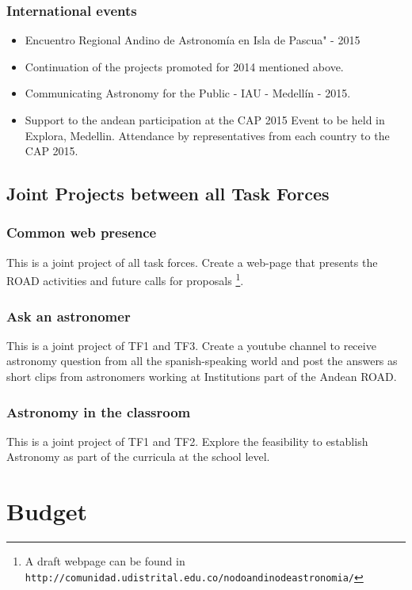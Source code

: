 \documentclass[12pt]{article}
\begin{document}
\subsubsection*{International events}


\begin{itemize}
\item Encuentro Regional Andino de Astronomía en Isla de Pascua" - 2015
\item Continuation of the projects promoted for 2014 mentioned above.
\item Communicating Astronomy for the Public - IAU - Medellín - 2015.
\item Support to the andean participation at the CAP 2015 Event to be
  held in Explora, Medellin. Attendance by representatives from each
  country to the CAP 2015.
\end{itemize}

\subsection{Joint Projects between all Task Forces} 

\subsubsection*{Common web presence}
This is a joint project of all task forces. Create a web-page that
presents the ROAD activities and future calls for
proposals \footnote{A draft webpage can be found in
  \texttt{http://comunidad.udistrital.edu.co/nodoandinodeastronomia/}}. 

\subsubsection*{Ask an astronomer}
This is a joint project of TF1 and TF3. Create a youtube channel to
receive astronomy question from all the spanish-speaking world and
post the answers as short clips from astronomers working at
Institutions part of the Andean ROAD. 

\subsubsection*{Astronomy in the classroom}
This is a joint project of TF1 and TF2. Explore the feasibility to
establish Astronomy as part of the curricula at the school level.  

\section{Budget}
\end{document}

